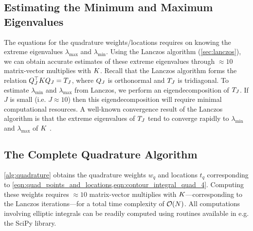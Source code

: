 \subsection{Estimating the Minimum and Maximum Eigenvalues}
The equations for the quadrature weights/locations requires on knowing the extreme eigenvalues $\lambda_\text{max}$ and $\lambda_\text{min}$.
Using the Lanczos algorithm (\cref{sec:lanczos}), we can obtain accurate estimates of these extreme eigenvalues through $\approx 10$ matrix-vector multiplies with $K$.
Recall that the Lanczos algorithm forms the relation $Q^\top_J K Q_J = T_J$, where $Q_J$ is orthonormal and $T_J$ is tridiagonal.
To estimate $\lambda_\text{min}$ and $\lambda_\text{max}$ from Lanczos, we perform an eigendecomposition of $T_J$.
If $J$ is small (i.e. $J \approx 10$) then this eigendecomposition will require minimal computational resources.
A well-known convergence result of the Lanczos algorithm is that the extreme eigenvalues of $T_J$ tend to converge rapidly to $\lambda_\text{min}$ and $\lambda_\text{max}$ of $K$ \citep[e.g.][]{saad2003iterative,golub2012matrix}.


\subsection{The Complete Quadrature Algorithm}
\cref{alg:quadrature} obtains the quadrature weights $w_q$ and locations $t_q$ corresponding to \cref{eqn:quad_points_and_locations,eqn:contour_integral_quad_4}.
Computing these weights requires $\approx 10$ matrix-vector multiplies with $K$---corresponding to the Lanczos iterations---for a total time complexity of $\bigo{N}$.
All computations involving elliptic integrals can be readily computed using routines available in e.g. the SciPy library.


